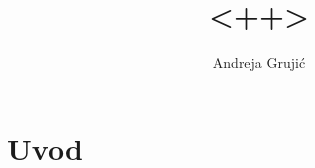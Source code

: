 \documentclass{article}
\author{Andreja Grujić}
\title{<++>}
\begin{document}
\maketitle
\tableofcontents

\section{Uvod}
\end{document}
